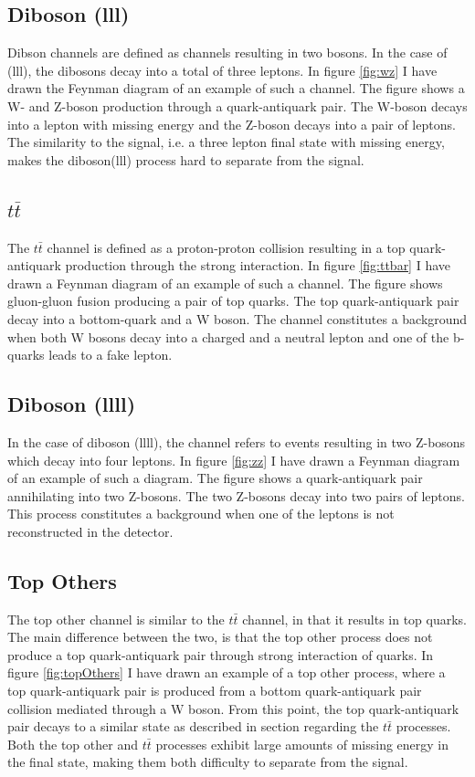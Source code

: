 \subsection*{Diboson (lll)}
Dibson channels are defined as channels resulting in two bosons. In the case of (lll), the dibosons
decay into a total of three leptons. In figure \ref{fig:wz} I have drawn the Feynman diagram of an 
example of such a channel. The figure shows a W- and Z-boson production through a quark-antiquark pair.
The W-boson decays into a lepton with missing energy and the Z-boson decays into a pair of leptons.
The similarity to the signal, i.e. a three lepton final state with missing energy, makes the diboson(lll)
process hard to separate from the signal.  

\subsection*{$t\bar{t}$}\label{subsec:ttbar}
The $t\bar{t}$ channel is defined as a proton-proton collision resulting in a top quark-antiquark production 
through the strong interaction. In figure \ref{fig:ttbar} I have drawn a Feynman diagram of an example of such 
a channel. The figure shows gluon-gluon fusion producing a pair of top quarks. The top quark-antiquark pair decay into 
a bottom-quark and a W boson. The channel constitutes a background when both W bosons decay into a charged and a 
neutral lepton and one of the b-quarks leads to a fake lepton.

\subsection*{Diboson (llll)}
In the case of diboson (llll), the channel refers to events resulting in two Z-bosons which decay 
into four leptons. In figure \ref{fig:zz} I have drawn a Feynman diagram of an example of 
such a diagram. The figure shows a quark-antiquark pair annihilating into two Z-bosons.
The two Z-bosons decay into two pairs of leptons. This process constitutes a background when one 
of the leptons is not reconstructed in the detector.

\subsection*{Top Others}
The top other channel is similar to the $t\bar{t}$ channel, in that it results in top quarks. The main difference between 
the two, is that the top other process does not produce a top quark-antiquark pair through strong interaction of quarks. 
In figure \ref{fig:topOthers} I have drawn an example of a top other process, where a top quark-antiquark pair is produced 
from a bottom quark-antiquark pair collision mediated through a W boson. From this point, the top quark-antiquark pair decays 
to a similar state as described in section regarding the $t\bar{t}$ processes. Both the top other and $t\bar{t}$ processes exhibit
large amounts of missing energy in the final state, making them both difficulty to separate from the signal. 

